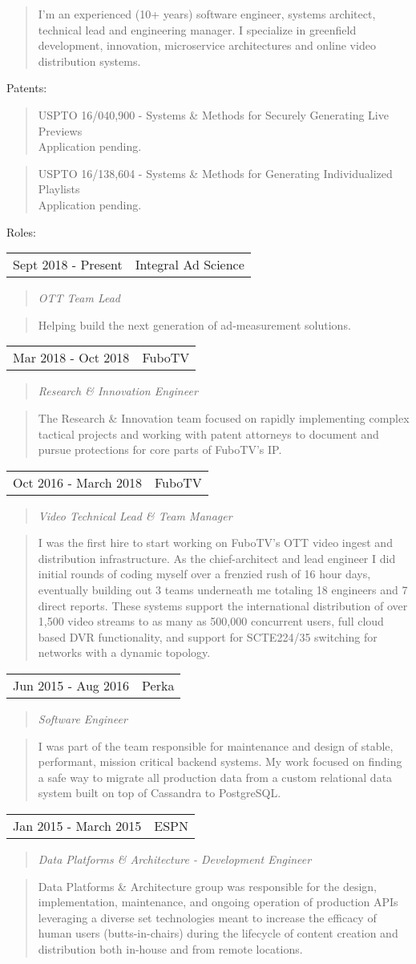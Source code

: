 \documentclass[11pt]{article}
\newcommand{\job}[5]{
  \begin{tabular}{l|l}
    #1 - #2 & #3 \\
  \end{tabular}
  \begin{quotation}
    \noindent\textit{#4}
  \end{quotation}
  \begin{quotation}
    \noindent#5
  \end{quotation} 
}
\newcommand{\pendingpatent}[2]{
  \begin{quotation}
    {\small\noindent#1 - #2}\\
    {\tiny Application pending.}
  \end{quotation}
}
\begin{document}
\begin{quotation}
  \noindent I'm an experienced (10+ years) software engineer, systems architect,
  technical lead and engineering manager. I specialize in greenfield
  development, innovation, microservice architectures and online video
  distribution systems.
\end{quotation}

\noindent Patents:

\pendingpatent{USPTO 16/040,900}{Systems \& Methods for Securely Generating Live
  Previews}

\pendingpatent{USPTO 16/138,604}{Systems \& Methods for Generating
  Individualized Playlists}

\noindent Roles:
\vspace{.1in}

\job{Sept 2018}{Present}{Integral Ad Science}{OTT Team Lead}{Helping build the
  next generation of ad-measurement solutions.}

\job{Mar 2018}{Oct 2018}{FuboTV}{Research \& Innovation Engineer}{The Research \&
  Innovation team focused on rapidly implementing complex tactical projects and
  working with patent attorneys to document and pursue protections for core
  parts of FuboTV’s IP.}

\job{Oct 2016}{March 2018}{FuboTV}{Video Technical Lead \& Team Manager}{I was the
  first hire to start working on FuboTV’s OTT video ingest and distribution
  infrastructure. As the chief-architect and lead engineer I did initial rounds
  of coding myself over a frenzied rush of 16 hour days, eventually building out
  3 teams underneath me totaling 18 engineers and 7 direct reports. These
  systems support the international distribution of over 1,500 video streams to
  as many as 500,000 concurrent users, full cloud based DVR functionality, and
  support for SCTE224/35 switching for networks with a dynamic topology.}

\job{Jun 2015}{Aug 2016}{Perka}{Software Engineer}{I was part of the team
  responsible for maintenance and design of stable, performant, mission critical
  backend systems. My work focused on finding a safe way to migrate all
  production data from a custom relational data system built on top of Cassandra
  to PostgreSQL.}

\pagebreak 

\job{Jan 2015}{March 2015}{ESPN}{Data Platforms \& Architecture - Development
  Engineer}{Data Platforms \& Architecture group was responsible for the design,
  implementation, maintenance, and ongoing operation of production APIs
  leveraging a diverse set technologies meant to increase the efficacy of human
  users (butts-in-chairs) during the lifecycle of content creation and
  distribution both in-house and from remote locations.}
\end{document}
